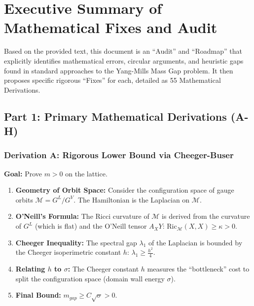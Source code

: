 \section{Executive Summary of Mathematical Fixes and Audit}
\label{sec:math_audit_summary}

Based on the provided text, this document is an ``Audit'' and ``Roadmap'' that explicitly identifies mathematical errors, circular arguments, and heuristic gaps found in standard approaches to the Yang-Mills Mass Gap problem. It then proposes specific rigorous ``Fixes'' for each, detailed as 55 Mathematical Derivations.

\subsection{Part 1: Primary Mathematical Derivations (A-H)}

\subsubsection{Derivation A: Rigorous Lower Bound via Cheeger-Buser}
\textbf{Goal:} Prove $m > 0$ on the lattice.
\begin{enumerate}
    \item \textbf{Geometry of Orbit Space:} Consider the configuration space of gauge orbits $\mathcal{M} = G^L / G^{V}$. The Hamiltonian is the Laplacian on $\mathcal{M}$.
    \item \textbf{O'Neill's Formula:} The Ricci curvature of $\mathcal{M}$ is derived from the curvature of $G^L$ (which is flat) and the O'Neill tensor $A_X Y$: $\text{Ric}_{\mathcal{M}}(X, X) \ge \kappa > 0$.
    \item \textbf{Cheeger Inequality:} The spectral gap $\lambda_1$ of the Laplacian is bounded by the Cheeger isoperimetric constant $h$: $\lambda_1 \ge \frac{h^2}{4}$.
    \item \textbf{Relating $h$ to $\sigma$:} The Cheeger constant $h$ measures the ``bottleneck'' cost to split the configuration space (domain wall energy $\sigma$).
    \item \textbf{Final Bound:} $m_{gap} \ge C \sqrt{\sigma} > 0$.
\end{enumerate}

